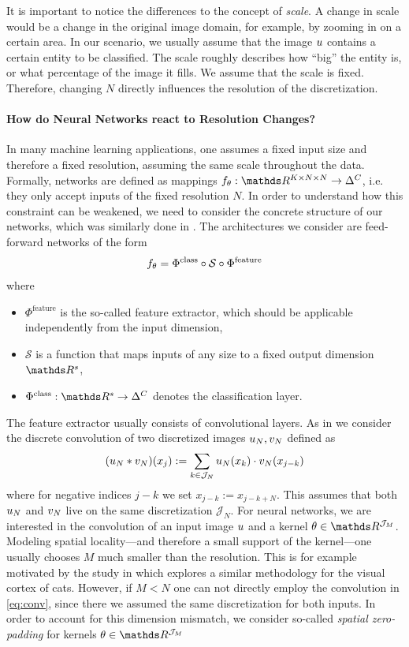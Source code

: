 It is important to notice the differences to the concept of \emph{scale}. A change in scale would be a change in the original image domain, for example, by zooming in on a certain area. In our scenario, we usually assume that the image $u$ contains a certain entity to be classified. The scale roughly describes how \enquote{big} the entity is, or what percentage of the image it fills. We assume that the scale is fixed. Therefore, changing $N$ directly influences the resolution of the discretization.

\paragraph{How do Neural Networks react to Resolution Changes?} In many machine learning applications, one assumes a fixed input size and therefore a fixed resolution, assuming the same scale throughout the data. Formally, networks are defined as mappings $\net_\param:\R^{K\times N\times N}\to\Delta^C$, i.e. they only accept inputs of the fixed resolution $N$. In order to understand how this constraint can be weakened, we need to consider the concrete structure of our networks, which was similarly done in \cite{kovachki2021universal, kabri2022FNO}. The architectures we consider are feed-forward networks of the form
%
\begin{align*}
f_\theta = \Phi^{\text{class}} \circ \mathcal{S}\circ \Phi^{\text{feature}}
\end{align*}
%
where 
%
\begin{itemize}
\item $\Phi^{\text{feature}}$ is the so-called feature extractor, which should be applicable independently from the input dimension,
\item $\mathcal{S}$ is a function that maps inputs of any size to a fixed output dimension $\R^s$,
\item $\Phi^{\text{class}}:\R^s\to\Delta^C$ denotes the classification layer.
\end{itemize}
%
%
%
The feature extractor usually consists of convolutional layers. As in \cite[Ch. 2]{kabri2022FNO} we consider the discrete convolution of two discretized images $u_N, v_N$ defined as 
%
\begin{align}\label{eq:conv}
(u_N\ast v_N)(x_j) := \sum_{k\in \mathcal{J}_N} u_N(x_k)\cdot v_N(x_{j-k})
\end{align}
%
where for negative indices $j-k$ we set $x_{j-k} := x_{j-k+N}$. This assumes that both $u_N$ and $v_N$ live on the same discretization $\mathcal{J}_N$. For neural networks, we are interested in the convolution of an input image $u$ and a kernel $\param\in\R^{\mathcal{J}_M}$. Modeling spatial locality---and therefore a small support of the kernel---one usually chooses $M$ much smaller than the resolution. This is for example motivated by the study in \cite{hubel1962receptive} which explores a similar methodology for the visual cortex of cats. However, if $M<N$ one can not directly employ the convolution in \cref{eq:conv}, since there we assumed the same discretization for both inputs. In order to account for this dimension mismatch, we consider so-called \emph{spatial zero-padding} for kernels $\param\in\R^{\mathcal{J}_M}$
